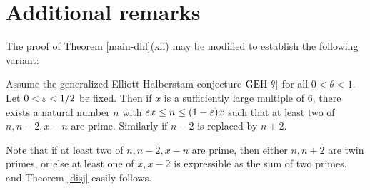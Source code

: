 \section{Additional remarks}\label{remarks-sec}

The proof of Theorem \ref{main-dhl}(xii) may be modified to establish the following variant:

\begin{proposition}  Assume the generalized Elliott-Halberstam conjecture $\operatorname*{GEH}[\theta]$ for all $0 < \theta < 1$.  Let $0 < \varepsilon < 1/2$ be fixed.  Then if $x$ is a sufficiently large multiple of $6$, there exists a natural number $n$ with $\varepsilon x \leq n \leq (1-\varepsilon) x$ such that at least two of $n, n-2, x-n$ are prime.  Similarly if $n-2$ is replaced by $n+2$.
\end{proposition}

Note that if at least two of $n,n-2,x-n$ are prime, then either $n,n+2$ are twin primes, or else at least one of $x,x-2$ is expressible as the sum of two primes, and Theorem \ref{disj} easily follows.

